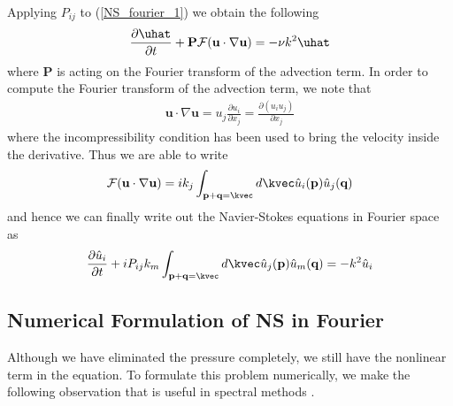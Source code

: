 Applying $P_{ij}$ to (\ref{NS_fourier_1}) we obtain the following 
\begin{align}
\frac{\partial \uhat}{\partial t} + \textbf{P}\mathcal{F}(\textbf{u}\cdot\nabla\textbf{u}) =  -\nu k^{2}\uhat\label{NS_fourier_3}
\end{align}
where $\textbf{P}$ is acting on the Fourier transform of the advection term. In order to compute the Fourier transform of the advection term, we note that 
\begin{align}
\textbf{u}\cdot\nabla\textbf{u} = u_{j}\frac{\partial u_{i}}{\partial x_{j}} = \frac{\partial (u_{i}u_{j})}{\partial x_{j}}
\end{align}
where the incompressibility condition has been used to bring the velocity inside the derivative. Thus we are able to write
\begin{align}
\mathcal{F}(\textbf{u}\cdot\nabla\textbf{u})=ik_{j}\int_{\textbf{p}+\textbf{q}=\kvec}d\kvec\hat{u}_{i}(\textbf{p})\hat{u}_{j}(\textbf{q})
\end{align}
and hence we can finally write out the Navier-Stokes equations in Fourier space as \cite{lesieur}
\begin{align}
\frac{\partial \hat{u}_{i}}{\partial t} + iP_{ij}k_{m}\int_{\textbf{p}+\textbf{q}=\kvec}d\kvec\hat{u}_{j}(\textbf{p})\hat{u}_{m}(\textbf{q})=  -k^{2}\hat{u}_{i}\label{NS_fourier_3}
\end{align}

\subsection{Numerical Formulation of NS in Fourier}
Although we have eliminated the pressure completely, we still have the nonlinear term in the equation. To formulate this problem numerically, we make the following observation that is useful in spectral methods \cite{lesieur,orszag1972}.

